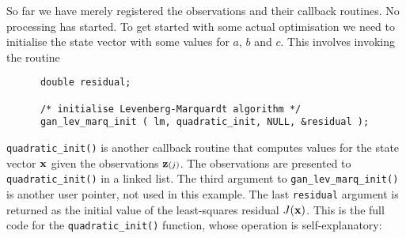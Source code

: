So far we have merely registered the observations and their callback
routines. No processing has started. To get started with some actual
optimisation we need to initialise the state vector with some values for
$a$, $b$ and $c$. This involves invoking the routine
\begin{verbatim}
      double residual;

      /* initialise Levenberg-Marquardt algorithm */
      gan_lev_marq_init ( lm, quadratic_init, NULL, &residual );
\end{verbatim}
{\tt quadratic\_init()} is another callback routine that computes values for
the state vector ${\bf x}$ given the observations ${\bf z}{\scriptstyle (j)}$. The observations
are presented to {\tt quadratic\_init()} in a linked list. The third argument
to {\tt gan\_lev\_marq\_init()} is another user pointer, not used in this
example. The last {\tt residual} argument is returned as the initial
value of the least-squares residual $J({\bf x})$. This is the full code for
the {\tt quadratic\_init()} function, whose operation is self-explanatory:
